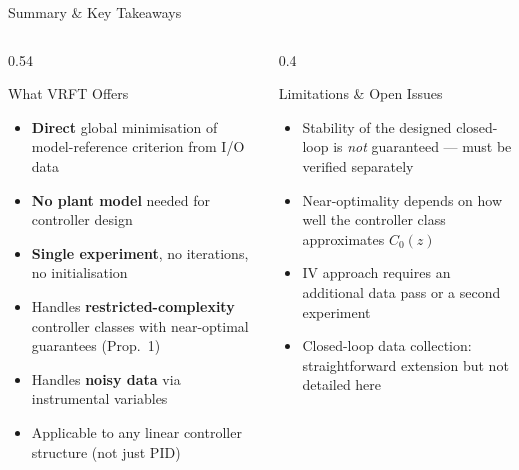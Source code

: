 \documentclass[hyperref={pdfpagemode=FullScreen},aspectratio=169]{beamer}
\begin{document}
\begin{frame}{Summary \& Key Takeaways}
  \begin{columns}[T]
    \begin{column}{0.54\textwidth}
      \begin{exampleblock}{What VRFT Offers}
        \begin{itemize}
          \setlength{\itemsep}{0.4em}
          \item \textbf{Direct} global minimisation of model-reference criterion from I/O data
          \item \textbf{No plant model} needed for controller design
          \item \textbf{Single experiment}, no iterations, no initialisation
          \item Handles \textbf{restricted-complexity} controller classes with near-optimal guarantees (Prop.~1)
          \item Handles \textbf{noisy data} via instrumental variables
          \item Applicable to any linear controller structure (not just PID)
        \end{itemize}
      \end{exampleblock}
    \end{column}
    \begin{column}{0.4\textwidth}
      \begin{alertblock}{Limitations \& Open Issues}
        \begin{itemize}
          \item Stability of the designed closed-loop is \emph{not} guaranteed --- must be verified separately
          \item Near-optimality depends on how well the controller class approximates $C_0(z)$
          \item IV approach requires an additional data pass or a second experiment
          \item Closed-loop data collection: straightforward extension but not detailed here
        \end{itemize}
      \end{alertblock}
    \end{column}
  \end{columns}
\end{frame}

\end{document}
